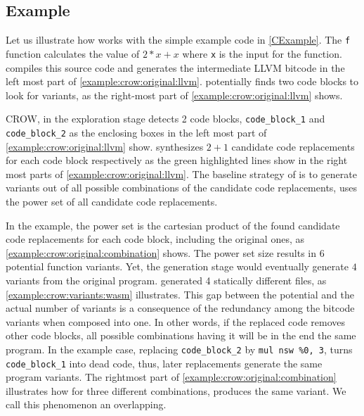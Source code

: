 
\subsection{Example}
\label{section:crow:example}
 Let us illustrate how works with the simple example code in \autoref{CExample}. The \texttt{f} function calculates the value of $2 * x + x$ where \texttt{x} is the input for the function.  compiles this source code and generates the intermediate LLVM bitcode in the left most part of \autoref{example:crow:original:llvm}. potentially finds two code blocks to look for variants, as the right-most part of \autoref{example:crow:original:llvm} shows.


    

CROW, in the exploration stage detects 2 code blocks, \texttt{code\_block\_1} and \texttt{code\_block\_2} as the enclosing boxes in the left most part of \autoref{example:crow:original:llvm} show. synthesizes $2 + 1$ candidate code replacements for each code block respectively as the green highlighted lines show in the right most parts of \autoref{example:crow:original:llvm}.
The baseline strategy of is to generate variants out of all possible combinations of the candidate code replacements, \ie uses the power set of all candidate code replacements.

In the example, the power set is the cartesian product of the found candidate code replacements for each code block, including the original ones, as \autoref{example:crow:original:combination} shows. The power set size results in $6$ potential function variants. Yet, the generation stage would eventually generate $4$ variants from the original program. generated 4 statically different files, as \autoref{example:crow:variants:wasm} illustrates. This gap between the potential and the actual number of variants is a consequence of the redundancy among the bitcode variants when composed into one. In other words, if the replaced code removes other code blocks, all possible combinations having it will be in the end the same program. In the example case, replacing \texttt{code\_block\_2} by \texttt{mul nsw \%0, 3}, turns \texttt{code\_block\_1} into dead code, thus, later replacements generate the same program variants. The rightmost part of \autoref{example:crow:original:combination} illustrates how for three different combinations, produces the same variant. We call this phenomenon an overlapping.

